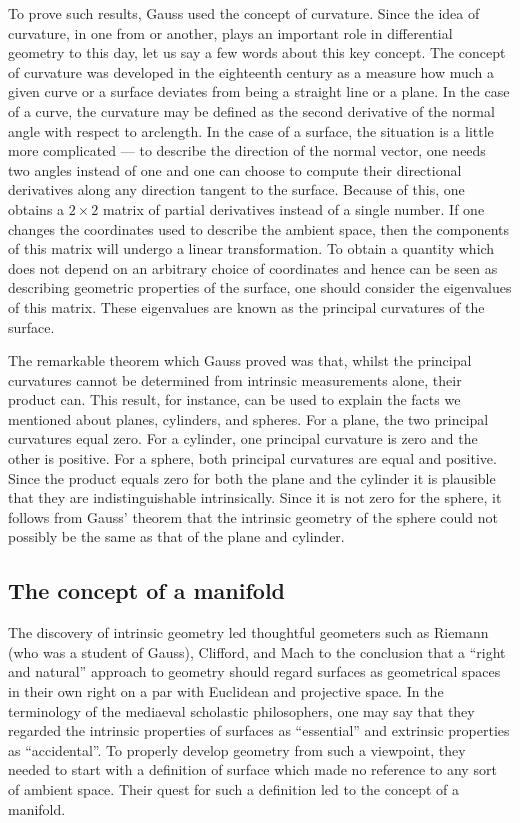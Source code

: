 \documentclass[12pt]{article}
\begin{document}
To prove such results, Gauss used the concept of curvature.  Since the
idea of curvature, in one from or another, plays an important role in
differential geometry to this day, let us say a few words about this
key concept.  The concept of curvature was developed in the eighteenth
century as a measure how much a given curve or a surface deviates from
being a straight line or a plane.  In the case of a curve, the
curvature may be defined as the second derivative of the normal angle
with respect to arclength.  In the case of a surface, the situation is
a little more complicated --- to describe the direction of the normal
vector, one needs two angles instead of one and one can choose to
compute their directional derivatives along any direction tangent to
the surface.  Because of this, one obtains a $2 \times 2$ matrix of
partial derivatives instead of a single number.  If one changes the
coordinates used to describe the ambient space, then the components of
this matrix will undergo a linear transformation.  To obtain a
quantity which does not depend on an arbitrary choice of coordinates
and hence can be seen as describing geometric properties of the
surface, one should consider the eigenvalues of this matrix.  These
eigenvalues are known as the principal curvatures of the surface.

The remarkable theorem which Gauss proved was that, whilst the
principal curvatures cannot be determined from intrinsic measurements
alone, their product can.  This result, for instance, can be used to
explain the facts we mentioned about planes, cylinders, and spheres.
For a plane, the two principal curvatures equal zero.  For a cylinder,
one principal curvature is zero and the other is positive.  For a
sphere, both principal curvatures are equal and positive.  Since the
product equals zero for both the plane and the cylinder it is
plausible that they are indistinguishable intrinsically.  Since it is
not zero for the sphere, it follows from Gauss' theorem that the
intrinsic geometry of the sphere could not possibly be the same as
that of the plane and cylinder.

\subsection{The concept of a manifold}

The discovery of intrinsic geometry led thoughtful geometers such as
Riemann (who was a student of Gauss), Clifford, and Mach to the
conclusion that a ``right and natural'' approach to geometry should
regard surfaces as geometrical spaces in their own right on a par with
Euclidean and projective space.  In the terminology of the mediaeval
scholastic philosophers, one may say that they regarded the intrinsic
properties of surfaces as ``essential'' and extrinsic properties as
``accidental''.  To properly develop geometry from such a viewpoint,
they needed to start with a definition of surface which made no
reference to any sort of ambient space.  Their quest for such a
definition led to the concept of a manifold.
\end{document}
